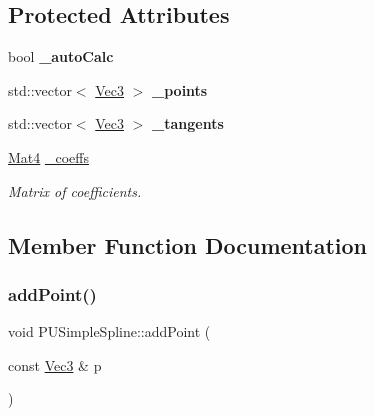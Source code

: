 \subsection*{Protected Attributes}
\begin{DoxyCompactItemize}
\item 
\mbox{\label{classPUSimpleSpline_ab4e4858fe762124b7f8497d44b4e62ea}} 
bool {\bfseries \+\_\+auto\+Calc}
\item 
\mbox{\label{classPUSimpleSpline_a745f6abb5d86eb5bd72115d800109825}} 
std\+::vector$<$ \hyperlink{classVec3}{Vec3} $>$ {\bfseries \+\_\+points}
\item 
\mbox{\label{classPUSimpleSpline_a0cd45f4eba2204c8fe917d121ff2b48e}} 
std\+::vector$<$ \hyperlink{classVec3}{Vec3} $>$ {\bfseries \+\_\+tangents}
\item 
\mbox{\label{classPUSimpleSpline_a08a4b615eca89551fe5031fe10380bd7}} 
\hyperlink{classMat4}{Mat4} \hyperlink{classPUSimpleSpline_a08a4b615eca89551fe5031fe10380bd7}{\+\_\+coeffs}
\begin{DoxyCompactList}\small\item\em Matrix of coefficients. \end{DoxyCompactList}\end{DoxyCompactItemize}


\subsection{Member Function Documentation}
\mbox{\label{classPUSimpleSpline_a0ddc226361cdefb81452c2ff42bd5f8f}} 
\subsubsection{\texorpdfstring{add\+Point()}{addPoint()}\hspace{0.1cm}{\footnotesize\ttfamily [1/2]}}
{\footnotesize\ttfamily void P\+U\+Simple\+Spline\+::add\+Point (\begin{DoxyParamCaption}\item[{const \hyperlink{classVec3}{Vec3} \&}]{p }\end{DoxyParamCaption})}

